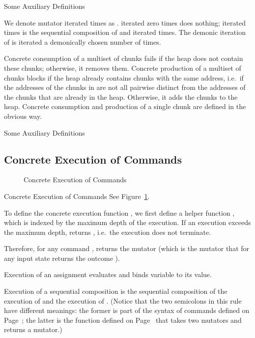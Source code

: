 \documentclass{CSML}
\theoremstyle{definition}\newtheorem{notation}[thm]{Notation}
\theoremstyle{plain}\newtheorem{satz}[thm]{Satz}
\begin{document}
\begin{defi}{Some Auxiliary Definitions}



\end{defi}

We denote mutator  iterated  times as .  iterated zero times does nothing;  iterated  times is the sequential composition of  and
 iterated  times. The demonic iteration  of  is  iterated a demonically chosen number of times.

Concrete consumption of a multiset  of chunks fails if the heap does not contain these chunks; otherwise, it removes them.
Concrete production of a multiset  of chunks blocks if the heap already contains chunks with the same address, i.e.~if the addresses of the chunks in  are not
all pairwise distinct from the addresses of the chunks that are already in the heap. Otherwise, it adds the chunks to the heap.
Concrete consumption and production of a single chunk  are defined in the obvious way.

\begin{defi}{Some Auxiliary Definitions}



\end{defi}

\subsection{Concrete Execution of Commands}

\begin{figure}


\caption{Concrete Execution of Commands}\label{fig:cexec}
\end{figure}

\begin{defi}{Concrete Execution of Commands}
See Figure~\ref{fig:cexec}.
\end{defi}

To define the concrete execution function , we 
first define a helper function , which is 
indexed by the maximum depth of the execution. If an execution 
exceeds the maximum depth,  returns , 
i.e.~the execution does not terminate.

Therefore, for any command ,  returns 
the mutator  (which is the mutator that for any input 
state returns the outcome ).

Execution of an assignment  evaluates  and binds variable  to its value.

Execution of a sequential composition  is the sequential 
composition of the execution of  and the execution of . 
(Notice that the two semicolons in this rule have different 
meanings: the former is part of the syntax of commands defined 
on Page~\pageref{cmd-syntax}; the latter is the function 
defined on Page~\pageref{mutator-seqcomp} that takes two 
mutators and returns a mutator.) 
\end{document}
